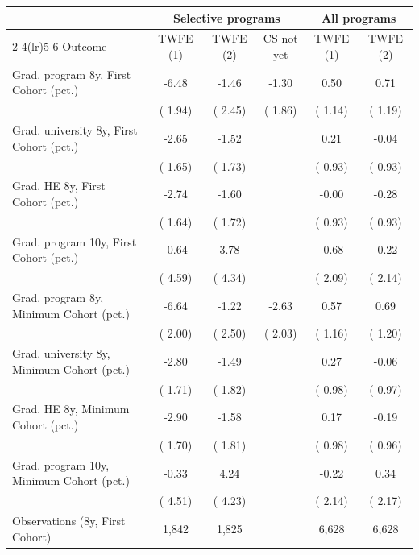 \begin{tabular}{lccccc}
\toprule
 & \multicolumn{3}{c}{Selective programs} & \multicolumn{2}{c}{All programs} \\
\cmidrule(lr){2-4}\cmidrule(lr){5-6}
Outcome & TWFE (1) & TWFE (2) & CS not yet & TWFE (1) & TWFE (2) \\
\midrule
Grad. program 8y, First Cohort (pct.) &  -6.48\sym{***} &  -1.46 &  -1.30 &   0.50 &   0.71 \\
 & ( 1.94) & ( 2.45) & ( 1.86) & ( 1.14) & ( 1.19) \\
Grad. university 8y, First Cohort (pct.) &  -2.65 &  -1.52 &  &   0.21 &  -0.04 \\
 & ( 1.65) & ( 1.73) &  & ( 0.93) & ( 0.93) \\
Grad. HE 8y, First Cohort (pct.) &  -2.74\sym{*} &  -1.60 &  &  -0.00 &  -0.28 \\
 & ( 1.64) & ( 1.72) &  & ( 0.93) & ( 0.93) \\
Grad. program 10y, First Cohort (pct.) &  -0.64 &   3.78 &  &  -0.68 &  -0.22 \\
 & ( 4.59) & ( 4.34) &  & ( 2.09) & ( 2.14) \\
\addlinespace
Grad. program 8y, Minimum Cohort (pct.) &  -6.64\sym{***} &  -1.22 &  -2.63 &   0.57 &   0.69 \\
 & ( 2.00) & ( 2.50) & ( 2.03) & ( 1.16) & ( 1.20) \\
Grad. university 8y, Minimum Cohort (pct.) &  -2.80 &  -1.49 &  &   0.27 &  -0.06 \\
 & ( 1.71) & ( 1.82) &  & ( 0.98) & ( 0.97) \\
Grad. HE 8y, Minimum Cohort (pct.) &  -2.90\sym{*} &  -1.58 &  &   0.17 &  -0.19 \\
 & ( 1.70) & ( 1.81) &  & ( 0.98) & ( 0.96) \\
Grad. program 10y, Minimum Cohort (pct.) &  -0.33 &   4.24 &  &  -0.22 &   0.34 \\
 & ( 4.51) & ( 4.23) &  & ( 2.14) & ( 2.17) \\
\midrule
Observations (8y, First Cohort) &  1,842 &  1,825 &  &  6,628 &  6,628 \\
\bottomrule
\end{tabular}
